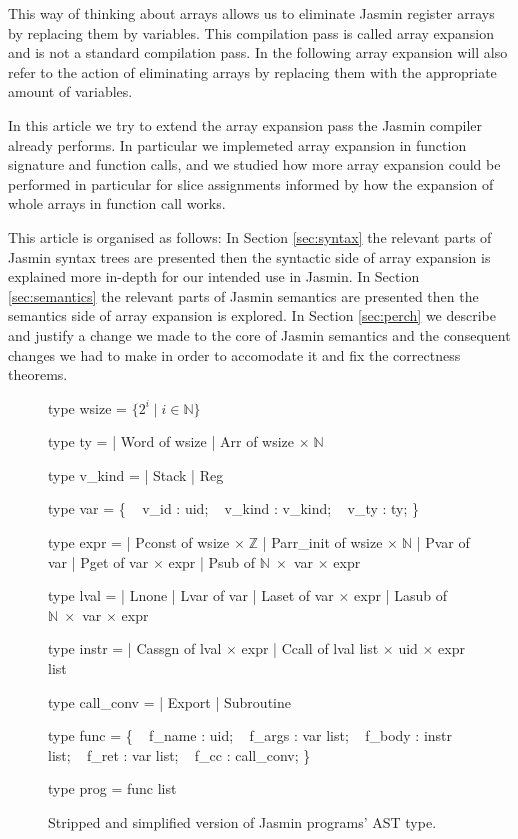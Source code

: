 \documentclass{article}
\newcommand\setZ{\mathbb{Z}}
\newcommand\setN{\mathbb{N}}
\begin{document}
This way of thinking about arrays allows us to eliminate Jasmin register arrays
by replacing them by variables. This compilation pass is called array expansion
and is not a standard compilation pass. In the following array expansion will
also refer to the action of eliminating arrays by replacing them with the
appropriate amount of variables.

\medskip

In this article we try to extend the array expansion pass the Jasmin compiler
already performs. In particular we implemeted array expansion in function
signature and function calls, and we studied how more array expansion could be
performed in particular for slice assignments informed by how the expansion of
whole arrays in function call works.

\medskip

This article is organised as follows:
In Section \ref{sec:syntax} the relevant parts of Jasmin syntax trees are
presented then the syntactic side of array expansion is explained more in-depth
for our intended use in Jasmin.
In Section \ref{sec:semantics} the relevant parts of Jasmin semantics are
presented then the semantics side of array expansion is explored.
In Section \ref{sec:perch} we describe and justify a change we made to the core
of Jasmin semantics and the consequent changes we had to make in order to
accomodate it and fix the correctness theorems.

\begin{figure}[t]
\obeylines\obeyspaces\ttfamily%
\begin{minipage}{0.45\textwidth}
type wsize = \(\{ 2^i \mid i \in \setN \}\)

type ty =
| Word of wsize
| Arr  of wsize \(\times\;\setN\)

type v\_kind =
| Stack
| Reg

type var = \{
~ v\_id   : uid;
~ v\_kind : v\_kind;
~ v\_ty   : ty;
\}

type expr =
| Pconst    of wsize \(\times\;\setZ\)
| Parr\_init of wsize \(\times\;\setN\)
| Pvar      of var
| Pget      of var \(\times\) expr
| Psub      of \(\setN\;\times\) var \(\times\) expr
\end{minipage}\hfill\vline\hfill\begin{minipage}{0.5\textwidth}
type lval =
| Lnone
| Lvar  of var
| Laset of var \(\times\) expr
| Lasub of \(\setN\;\times\) var \(\times\) expr

type instr =
| Cassgn of lval \(\times\) expr
| Ccall  of lval list \(\times\) uid \(\times\) expr list

type call\_conv =
| Export
| Subroutine

type func = \{
~ f\_name : uid;
~ f\_args : var list;
~ f\_body : instr list;
~ f\_ret  : var list;
~ f\_cc   : call\_conv;
\}

type prog = func list
\end{minipage}\normalfont%
\caption{Stripped and simplified version of Jasmin programs' AST type.}\label{fig:types}
\end{figure}
\end{document}

